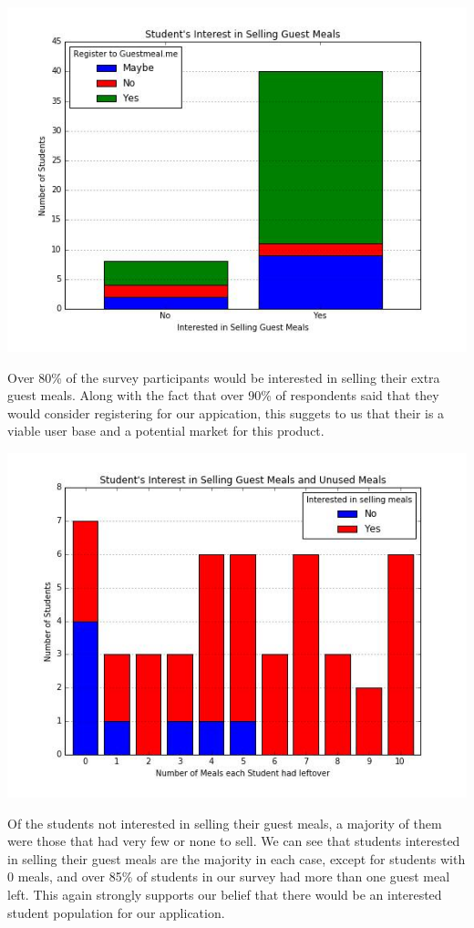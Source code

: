 \documentclass[column,12pt]{article}
\begin{document}
\centerline{\includegraphics[scale=0.5]{interest.png}}
Over 80\% of the survey participants would be interested in selling their extra guest meals. Along with the fact that over 90\% of respondents said that they would consider registering for our appication, this suggets to us that their is a viable user base and a potential market for this product. 

\centerline{\includegraphics[scale=0.5]{availablemeals.png}}
Of the students not interested in selling their guest meals, a majority of them were those that had very few or none to sell. We can see that students interested in selling their guest meals are the majority in each case, except for students with 0 meals, and over 85\% of students in our survey had more than one guest meal left. This again strongly supports our belief that there would be an interested student population for our application. 
\end{document}
